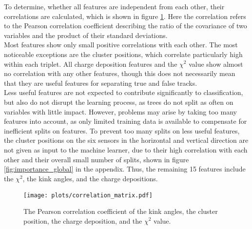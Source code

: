 To determine, whether all features are independent from each other, their correlations are calculated, which is shown in figure \ref{fig:corr}. Here the correlation
refers to the Pearson correlation coefficient \cite{pearson} describing the ratio of the covariance of two variables and the product of their standard deviations. \\
Most features show only small positive correlations with each other. The most noticeable exceptions are the cluster positions, which correlate particularly high within each
triplet. All charge deposition features and the $\chi^2$ value show almost no correlation with any other features, though this does not necessarily mean that they are
useful features for separating true and false tracks. \\
Less useful features
are not expected to contribute significantly to classification, but also do not disrupt the learning process, as trees do not split as often on variables with little impact.
However, problems may arise by taking too many features into account, as only limited training data is available to compensate for inefficient splits on features.
To prevent too many splits on less useful features, the cluster positions on the six sensors in the horizontal and vertical direction are not given as input to the machine learner,
due to their high correlation with each other and their overall small number of splits, shown in figure \ref{fig:importance_global} in the appendix.
Thus, the remaining 15 features include the $\chi^2$, the kink angles, and the charge depositions.
\begin{figure}
  \hspace{-2.5cm}
  \texttt{[image: plots/correlation\_matrix.pdf]}
  \vspace{-1.8cm}
  \caption{The Pearson correlation coefficient of the kink angles, the cluster position, the charge deposition, and the $\chi^2$ value.}
  \label{fig:corr}
\end{figure}

